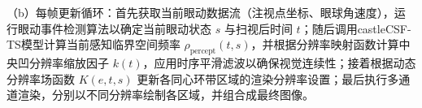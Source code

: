 （b）每帧更新循环：首先获取当前眼动数据流（注视点坐标、眼球角速度），运行眼动事件检测算法以确定当前眼动状态 \(s\) 与扫视后时间 \(t\)；随后调用castleCSF-TS模型计算当前感知临界空间频率 \(\rho_{\text{percept}}(t,s)\)，并根据分辨率映射函数计算中央凹分辨率缩放因子 \(k(t)\)，应用时序平滑滤波以确保视觉连续性；接着根据动态分辨率场函数 \(K(e,t,s)\) 更新各同心环带区域的渲染分辨率设置；最后执行多通道渲染，分别以不同分辨率绘制各区域，并组合成最终图像。
        
        
        


